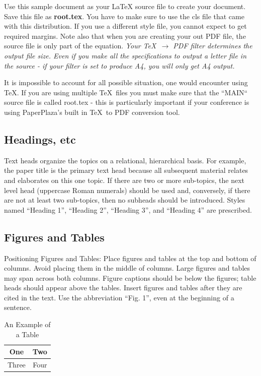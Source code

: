 \documentclass[letterpaper, 10 pt, conference]{ieeeconf}  %
\begin{document}
Use this sample document as your LaTeX source file to create your document. Save this file as {\bf root.tex}. You have to make sure to use the cls file that came with this distribution. If you use a different style file, you cannot expect to get required margins. Note also that when you are creating your out PDF file, the source file is only part of the equation. {\it Your \TeX\ $\rightarrow$ PDF filter determines the output file size. Even if you make all the specifications to output a letter file in the source - if your filter is set to produce A4, you will only get A4 output. }

It is impossible to account for all possible situation, one would encounter using \TeX. If you are using multiple \TeX\ files you must make sure that the ``MAIN`` source file is called root.tex - this is particularly important if your conference is using PaperPlaza's built in \TeX\ to PDF conversion tool.

\subsection{Headings, etc}

Text heads organize the topics on a relational, hierarchical basis. For example, the paper title is the primary text head because all subsequent material relates and elaborates on this one topic. If there are two or more sub-topics, the next level head (uppercase Roman numerals) should be used and, conversely, if there are not at least two sub-topics, then no subheads should be introduced. Styles named “Heading 1”, “Heading 2”, “Heading 3”, and “Heading 4” are prescribed.

\subsection{Figures and Tables}

Positioning Figures and Tables: Place figures and tables at the top and bottom of columns. Avoid placing them in the middle of columns. Large figures and tables may span across both columns. Figure captions should be below the figures; table heads should appear above the tables. Insert figures and tables after they are cited in the text. Use the abbreviation “Fig. 1”, even at the beginning of a sentence.

\begin{table}[h]
\caption{An Example of a Table}
\label{table_example}
\begin{center}
\begin{tabular}{|c||c|}
\hline
One & Two\\
\hline
Three & Four\\
\hline
\end{tabular}
\end{center}
\end{table}
\end{document}
